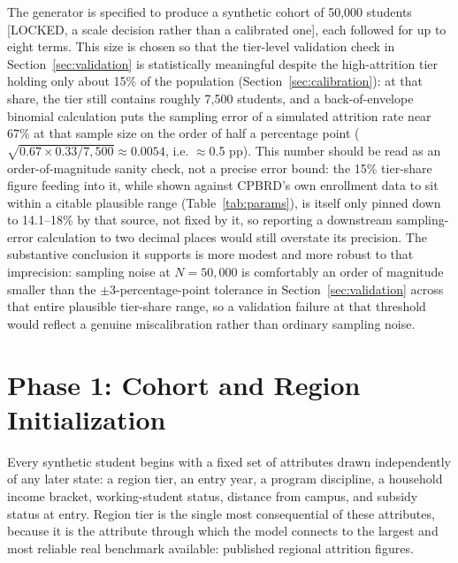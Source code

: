 \documentclass[11pt]{article}
\begin{document}
The generator is specified to produce a synthetic cohort of 50,000 students [LOCKED, a scale decision rather than a calibrated one], each followed for up to eight terms. This size is chosen so that the tier-level validation check in Section~\ref{sec:validation} is statistically meaningful despite the high-attrition tier holding only about 15\% of the population (Section~\ref{sec:calibration}): at that share, the tier still contains roughly 7,500 students, and a back-of-envelope binomial calculation puts the sampling error of a simulated attrition rate near 67\% at that sample size on the order of half a percentage point ($\sqrt{0.67 \times 0.33 / 7{,}500} \approx 0.0054$, i.e. $\approx$0.5 pp). This number should be read as an order-of-magnitude sanity check, not a precise error bound: the 15\% tier-share figure feeding into it, while shown against CPBRD's own enrollment data to sit within a citable plausible range (Table~\ref{tab:params}), is itself only pinned down to 14.1--18\% by that source, not fixed by it, so reporting a downstream sampling-error calculation to two decimal places would still overstate its precision. The substantive conclusion it supports is more modest and more robust to that imprecision: sampling noise at $N=50{,}000$ is comfortably an order of magnitude smaller than the $\pm$3-percentage-point tolerance in Section~\ref{sec:validation} across that entire plausible tier-share range, so a validation failure at that threshold would reflect a genuine miscalibration rather than ordinary sampling noise.


\section{Phase 1: Cohort and Region Initialization}
\label{sec:phase1}

Every synthetic student begins with a fixed set of attributes drawn independently of any later state: a region tier, an entry year, a program discipline, a household income bracket, working-student status, distance from campus, and subsidy status at entry. Region tier is the single most consequential of these attributes, because it is the attribute through which the model connects to the largest and most reliable real benchmark available: published regional attrition figures.
\end{document}

